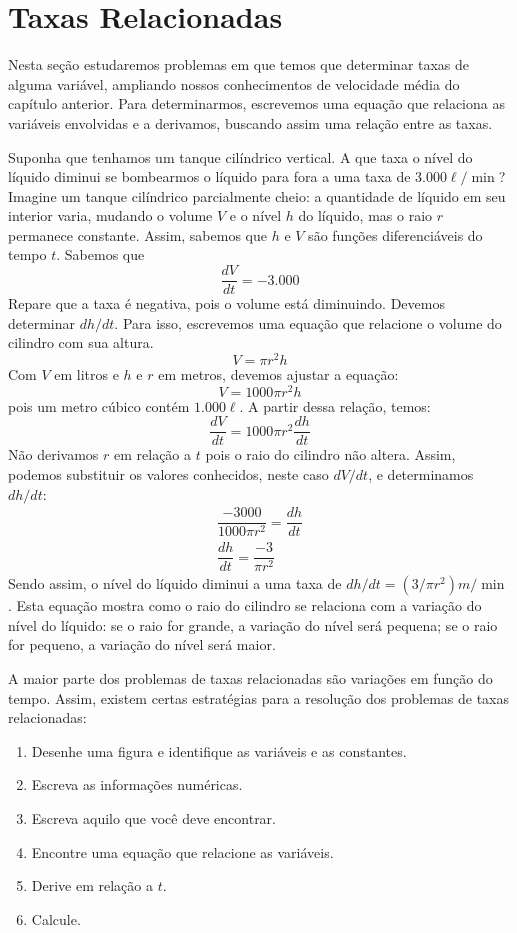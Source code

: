 \section{Taxas Relacionadas}
Nesta seção estudaremos problemas em que temos que determinar taxas de alguma variável, ampliando nossos conhecimentos de velocidade média do capítulo anterior. Para determinarmos, escrevemos uma equação que relaciona as variáveis envolvidas e a derivamos, buscando assim uma relação entre as taxas.
\begin{exemplo}
Suponha que tenhamos um tanque cilíndrico vertical. A que taxa o nível do líquido diminui se bombearmos o líquido para fora a uma taxa de $3.000 \ell/\min$? \\
Imagine um tanque cilíndrico parcialmente cheio: a quantidade de líquido em seu interior varia, mudando o volume $V$ e o nível $h$ do líquido, mas o raio $r$ permanece constante. Assim, sabemos que $h$ e $V$ são funções diferenciáveis do tempo $t$. Sabemos que \[\dfrac{dV}{dt}=-3.000\] Repare que a taxa é negativa, pois o volume está diminuindo.
Devemos determinar $dh/dt$. Para isso, escrevemos uma equação que relacione o volume do cilindro com sua altura.
\[V=\pi r^2 h\]
Com $V$ em litros e $h$ e $r$ em metros, devemos ajustar a equação:
\[V=1000 \pi r^2 h\]
pois um metro cúbico contém $1.000 \ell$.
A partir dessa relação, temos:
\[\dfrac{dV}{dt}=1000\pi r^2 \dfrac{dh}{dt} \]
Não derivamos $r$ em relação a $t$ pois o raio do cilindro não altera. Assim, podemos substituir os valores conhecidos, neste caso $dV/dt$, e determinamos $dh/dt$:
\begin{align*}
\dfrac{-3000}{1000\pi r^2}=\dfrac{dh}{dt}\\
\dfrac{dh}{dt}=\dfrac{-3}{\pi r^2}
\end{align*}
Sendo assim, o nível do líquido diminui a uma taxa de $dh/dt=(3/\pi r^2) m/\min$. Esta equação mostra como o raio do cilindro se relaciona com a variação do nível do líquido: se o raio for grande, a variação do nível será pequena; se o raio for pequeno, a variação do nível será maior.
\end{exemplo}
A maior parte dos problemas de taxas relacionadas são variações em função do tempo. Assim, existem certas estratégias para a resolução dos problemas de taxas relacionadas:\cite{thomas}
\begin{enumerate}
\item Desenhe uma figura e identifique as variáveis e as constantes. 
\item Escreva as informações numéricas.
\item Escreva aquilo que você deve encontrar.
\item Encontre uma equação que relacione as variáveis.
\item Derive em relação a $t$.
\item Calcule.
\end{enumerate}


